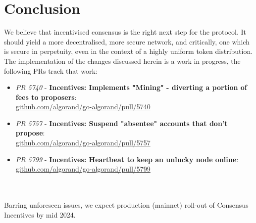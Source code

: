 \documentclass[11pt,a4paper]{article}
\begin{document}
\pagebreak

\section{Conclusion}
We believe that incentivised consensus is the right next step for the protocol. It should yield a more decentralised,  
more secure network, and critically, one which is secure in perpetuity, even in the context of a highly uniform token
distribution. \\ 

The implementation of the changes discussed herein is a work in progress, the following PRs track that work:


\begin{itemize}
    \item \emph{PR 5740} - \textbf{Incentives: Implements "Mining" - diverting a portion of fees to proposers}:\\
          \href{https://github.com/algorand/go-algorand/pull/5740}{github.com/algorand/go-algorand/pull/5740} \\
    \item \emph{PR 5757} - \textbf{Incentives: Suspend "absentee" accounts that don't propose}:\\
          \href{https://github.com/algorand/go-algorand/pull/5757}{github.com/algorand/go-algorand/pull/5757} \\
    \item \emph{PR 5799} - \textbf{Incentives: Heartbeat to keep an unlucky node online}:\\
          \href{https://github.com/algorand/go-algorand/pull/5799}{github.com/algorand/go-algorand/pull/5799}
\end{itemize} \mbox{} \\ \\ 


Barring unforeseen issues, we expect production (mainnet) roll-out of Consensus Incentives by mid 2024.

\pagebreak

\printglossaries

\pagebreak
\end{document}
